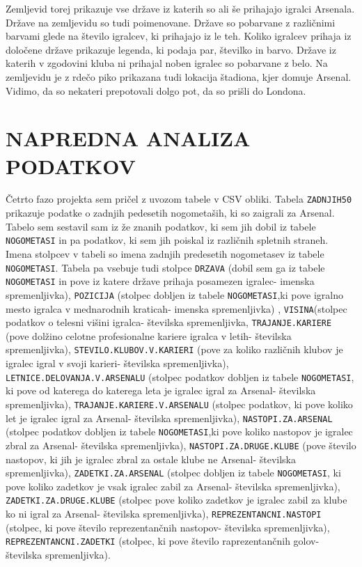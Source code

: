 \documentclass[11pt,a4paper]{article}
\begin{document}
Zemljevid torej prikazuje vse države iz katerih so ali še prihajajo igralci Arsenala. Države na zemljevidu so tudi poimenovane. Države so pobarvane z različnimi barvami glede na število igralcev, ki prihajajo iz le teh. Koliko igralcev prihaja iz določene države prikazuje legenda, ki podaja par, številko in barvo. Države iz katerih v zgodovini kluba ni prihajal noben igralec so pobarvane z belo. Na zemljevidu je z rdečo piko prikazana tudi lokacija štadiona, kjer domuje Arsenal. Vidimo, da so nekateri prepotovali dolgo pot, da so prišli do Londona.



\section{NAPREDNA ANALIZA PODATKOV}
Četrto fazo projekta sem pričel z uvozom tabele v CSV obliki. Tabela \verb|ZADNJIH50| prikazuje podatke o zadnjih pedesetih nogometaših, ki so zaigrali za Arsenal. Tabelo sem sestavil sam iz že znanih podatkov, ki sem jih dobil iz tabele \verb|NOGOMETASI| in pa podatkov, ki sem jih poiskal iz različnih spletnih straneh. Imena stolpcev v tabeli so imena zadnjih predesetih nogometasev iz tabele \verb|NOGOMETASI|. Tabela pa vsebuje tudi stolpce \verb|DRZAVA| (dobil sem ga iz tabele \verb|NOGOMETASI| in pove iz katere države prihaja posamezen igralec- imenska spremenljivka), \verb|POZICIJA| (stolpec dobljen iz tabele \verb|NOGOMETASI|,ki pove igralno mesto igralca v mednarodnih kraticah- imenska spremenljivka) , \verb|VISINA|(stolpec podatkov o telesni višini igralca- številska spremenljivka, \verb|TRAJANJE.KARIERE| (pove dolžino celotne profesionalne kariere igralca v letih- številska spremenljivka), \verb|STEVILO.KLUBOV.V.KARIERI| (pove za koliko različnih klubov je igralec igral v svoji karieri- številska spremenljivka), \verb|LETNICE.DELOVANJA.V.ARSENALU| (stolpec podatkov dobljen iz tabele \verb|NOGOMETASI|, ki pove od katerega do katerega leta je igralec igral za Arsenal- številska spremenljivka), \verb|TRAJANJE.KARIERE.V.ARSENALU| (stolpec podatkov, ki pove koliko let je igralec igral za Arsenal- številska spremenljivka), \verb|NASTOPI.ZA.ARSENAL| (stolpec podatkov dobljen iz tabele \verb|NOGOMETASI|,ki pove koliko nastopov je igralec zbral za Arsenal- številska spremenljivka), \verb|NASTOPI.ZA.DRUGE.KLUBE| (pove število nastopov, ki jih je igralec zbral za ostale klube ne Arsenal- številska spremenljivka), \verb|ZADETKI.ZA.ARSENAL| (stolpec dobljen iz tabele \verb|NOGOMETASI|, ki pove koliko zadetkov je vsak igralec zabil za Arsenal- številska spremenljivka), \verb|ZADETKI.ZA.DRUGE.KLUBE| (stolpec pove koliko zadetkov je igralec zabil za klube ko ni igral za Arsenal- številska spremenljivka), \verb|REPREZENTANCNI.NASTOPI| (stolpec, ki pove število reprezentančnih nastopov- številska spremenljivka), \verb|REPREZENTANCNI.ZADETKI| (stolpec, ki pove število raprezentančnih golov- številska spremenljivka).
\end{document}
